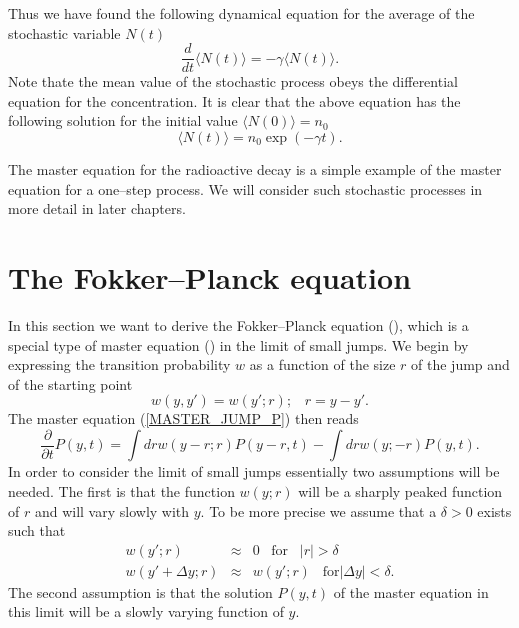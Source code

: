 Thus we have found the following dynamical equation for the 
average of the stochastic 
variable $N(t)$
\begin{equation}
\frac{d}{dt} \langle N(t) \rangle = - \gamma \langle N(t) \rangle.
\end{equation}
Note thate the mean value of the stochastic process obeys the 
differential equation for the concentration. It is clear that the 
above equation has the following solution for the initial value
$\langle N(0)\rangle = n_0$
\begin{equation*}
\langle N(t) \rangle = n_0 \exp(-\gamma t).
\end{equation*}

The master equation for the radioactive decay is a simple example 
of the master equation for a one--step process. We will consider
such stochastic processes in more detail in later chapters.


\section{The Fokker--Planck equation}
In this section we want to derive the Fokker--Planck equation
(\cite{RISKEN}),
which is a special type of master equation (\cite{VAN_KAMPEN})
in the limit of small jumps.
We begin by expressing the transition probability $w$ as a 
function of the size $r$ of the jump and of the starting point
\begin{equation*}
w(y,y') = w(y';r); \;\;\; r=y-y'.
\end{equation*}
The master equation (\ref{MASTER_JUMP_P}) then reads
\begin{equation}
\label{MASTER_SMALL_JUMP}
\frac{\partial}{\partial t} P(y,t) =
  \int dr w(y-r;r)P(y-r,t) - \int dr w(y;-r)P(y,t).
\end{equation}
In order to consider the limit of small jumps essentially
two assumptions will be needed. The first is that
the function
$w(y;r)$ will be a sharply peaked function of $r$ and will
vary slowly with $y$. To be more precise we assume that a $\delta >0$
exists such that
\begin{eqnarray*}
w(y';r)  & \approx & 0 \;\;\; \text{for} \;\;\; |r|> \delta \\
w(y'+\Delta y;r) & \approx & w(y';r) \;\;\; \text{for} |\Delta y| < 
\delta.
\end{eqnarray*}
The second assumption is that the solution $P(y,t)$ of the master equation 
in this limit will be a slowly varying function of $y$.

